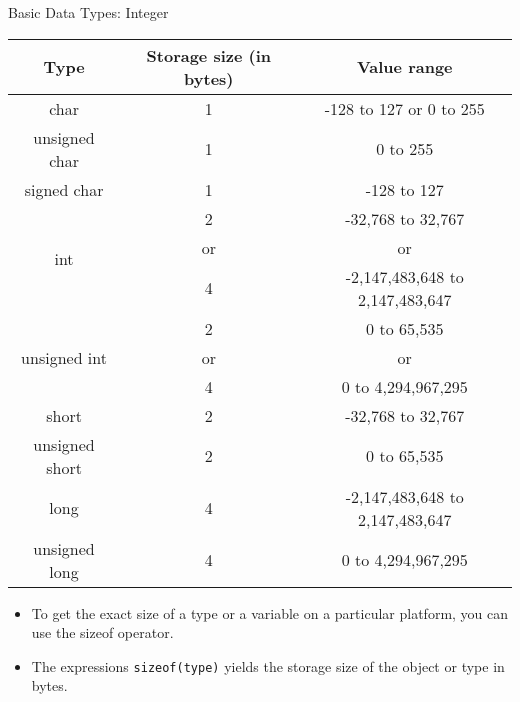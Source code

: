 \documentclass[10pt,t]{beamer}
\begin{document}
\begin{frame}[fragile]{Basic Data Types: Integer}
  \begin{center}
    \begin{tabular}{|c|c|c|}
      \hline
      Type & Storage size (in bytes) & Value range \\
      \hline
      char            & 1      & -128 to 127 or 0 to 255 \\
      unsigned char   & 1      & 0 to 255 \\
      signed char     & 1      & -128 to 127 \\
      \hline
      \multirow{3}{*}{int} & 2 & -32,768 to 32,767 \\ & or & or \\ & 4 &  -2,147,483,648 to 2,147,483,647 \\
      \hline
      \multirow{3}{*}{unsigned int} & 2 & 0 to 65,535 \\ & or & or  \\ & 4 & 0 to 4,294,967,295 \\
      \hline
      short           & 2      & -32,768 to 32,767 \\
      unsigned short  & 2      & 0 to 65,535 \\ 
      \hline
      long            & 4      & -2,147,483,648 to 2,147,483,647 \\
      unsigned long   & 4      & 0 to 4,294,967,295 \\
      \hline
    \end{tabular}
  \end{center}
  \begin{itemize}
    \item To get the exact size of a type or a variable on a particular platform, you can use the sizeof operator. 
    \item The expressions \lstinline|sizeof(type)| yields the storage size of the object or type in bytes. 
  \end{itemize}
\end{frame}
\end{document}
